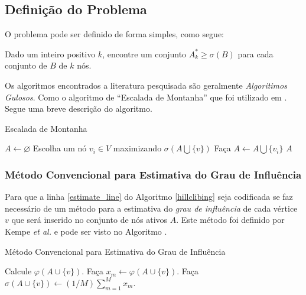 \documentclass{acm_proc_article-sp}
\begin{document}
\subsection{Definição do Problema}
O problema pode ser definido de forma simples, como segue: 

\begin{definicao}
Dado um inteiro positivo $k$, encontre um conjunto $A^{*}_{k} \geq \sigma(B)$ para cada conjunto de $B$ de $k$ nós.
\end{definicao}

Os algoritmos encontrados a literatura pesquisada são geralmente \textit{Algoritimos Gulosos}. Como o algoritmo
de ``Escalada de Montanha'' que foi utilizado em \cite{kimura:2007}. Segue uma breve descrição do algoritmo.

\begin{algorithm}[H]
\caption{Escalada de Montanha}\label{hillclibing}
\begin{algorithmic}[1]
	\State $A \gets \varnothing$
		\State Escolha um nó $v_{i} \in V$ maximizando $\sigma(A \bigcup \{v\})$ \label{estimate_line}  \State Faça $A \gets A \bigcup \{v_{i}\}$
	\EndFor
	\State \Return $A$
\EndProcedure
\end{algorithmic}
\end{algorithm}

\subsubsection{Método Convencional para Estimativa do Grau de Influência}\label{sec-convencional}
Para que a linha \ref{estimate_line} do Algoritmo \ref{hillclibing} seja codificada se faz necessário de um método
para a estimativa do \textit{grau de influência} de cada vértice $v$ que será inserido no conjunto de nós ativos
$A$. Este método foi definido por Kempe \textit{et al.}\cite{kempe:2003} e pode ser visto no Algoritmo .

\begin{algorithm}[H]
\caption{Método Convencional para Estimativa do Grau de Influência}\label{convencional}
\begin{algorithmic}[1]
		\State Calcule $\varphi(A \cup \{v\})$. 		
		\State Faça $x_{m} \gets \varphi(A \cup \{v\})$.
	\EndFor
	\State Faça $\sigma(A \cup \{v\}) \gets (1/M)\sum^{M}_{m=1} x_{m}$.
\EndProcedure
\end{algorithmic}
\end{algorithm}
\end{document}
